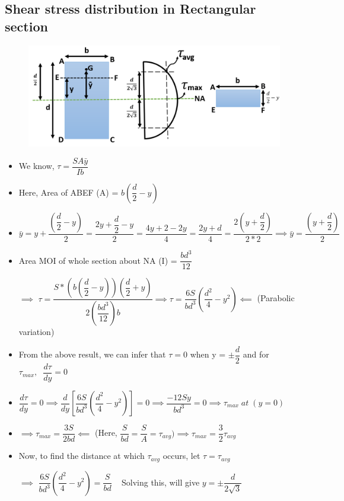 \documentclass[8pt]{report}
\begin{document}
	\subsection{Shear stress distribution in Rectangular section}
		\begin{figure}[H]
			\centering
			\includegraphics[scale=0.4]{shearstressdistribution_rectangle.png}
		\end{figure}
		\begin{itemize}
			\item We know, $\boxed{\tau = \dfrac{SA\bar{y}}{Ib}}$
			\item Here, Area of ABEF (A) = $b\left(\dfrac{d}{2}-y\right)$
			\item $\bar{y} = y + \dfrac{(\dfrac{d}{2}-y)}{2} = \dfrac{2y + \dfrac{d}{2} -y}{2} = \dfrac{4y+2-2y}{4} = \dfrac{2y+d}{4} = \dfrac{2(y+\dfrac{d}{2})}{2*2} \implies \boxed{\bar{y}=\dfrac{\left(y+\dfrac{d}{2}\right)}{2}}$
			\item Area MOI of whole section about NA (I) = $\dfrac{bd^3}{12}$
			\item[$\implies$] $\tau = \dfrac{S*\left(b\left(\dfrac{d}{2}-y\right)\right)\left(\dfrac{d}{2}+y\right)}{2\left(\dfrac{bd^3}{12}\right)b} \implies \boxed{\tau = \dfrac{6S}{bd^3}\left(\dfrac{d^2}{4}-y^2\right)} \impliedby$ (Parabolic variation)
			\item From the above result, we can infer that $\tau = 0$ when y = $\pm\dfrac{d}{2}$ and for $\tau_{max},\;\;\dfrac{d\tau}{dy} = 0$
			\item $\dfrac{d\tau}{dy} = 0 \implies \dfrac{d}{dy}\left[\dfrac{6S}{bd^3}\left(\dfrac{d^2}{4}-y^2\right)\right] = 0 \implies \dfrac{-12Sy}{bd^3} = 0 \implies \boxed{\tau_{max}\;at\;(y=0)}$
			\item $\implies \boxed{\tau_{max} = \dfrac{3S}{2bd}} \impliedby$ (Here, $\dfrac{S}{bd} = \dfrac{S}{A} = \tau_{avg}) \implies \boxed{\tau_{max} = \dfrac{3}{2}\tau_{avg}}$
			\item Now, to find the distance at which $\tau_{avg}$ occurs, let $\tau = \tau_{avg}$
			\item[$\implies$] $\dfrac{6S}{bd^3}\left(\dfrac{d^2}{4}-y^2\right) = \dfrac{S}{bd}\;\;\;$ Solving this, will give $\boxed{y = \pm\dfrac{d}{2\sqrt{3}}}$
		\end{itemize}\hrulefill
\end{document}
